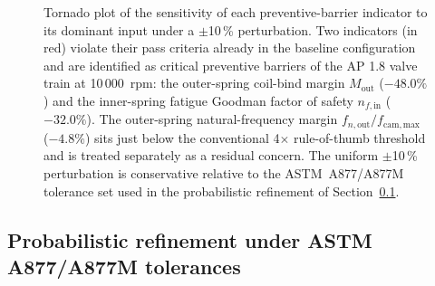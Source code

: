\begin{figure}[!htbp]
  \centering
  \resizebox{\linewidth}{!}{}
  \caption{Tornado plot of the sensitivity of each preventive-barrier indicator to its dominant input under a $\pm$10\,\% perturbation. Two indicators (in red) violate their pass criteria already in the baseline configuration and are identified as critical preventive barriers of the AP 1.8 valve train at 10\,000~rpm: the outer-spring coil-bind margin $M_{\mathrm{out}}$ ($-48.0\%$) and the inner-spring fatigue Goodman factor of safety $n_{f,\mathrm{in}}$ ($-32.0\%$). The outer-spring natural-frequency margin $f_{n,\mathrm{out}}/f_{\mathrm{cam,max}}$ ($-4.8\%$) sits just below the conventional 4$\times$ rule-of-thumb threshold and is treated separately as a residual concern. The uniform $\pm$10\,\% perturbation is conservative relative to the ASTM~A877/A877M tolerance set used in the probabilistic refinement of Section~\ref{sec:res-mc}.}\label{fig:tornado}
\end{figure}

\subsection{Probabilistic refinement under ASTM A877/A877M tolerances}
\label{sec:res-mc}

